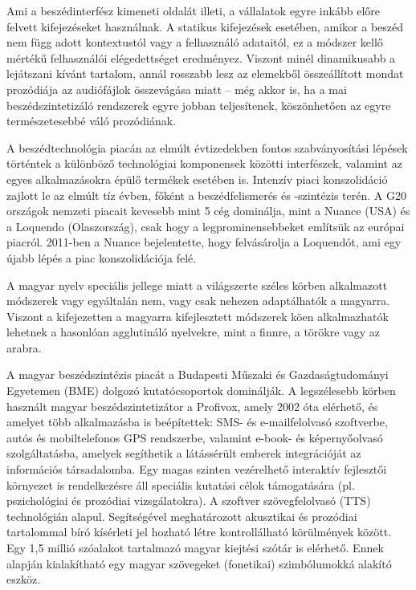 \begin{multicols}{2}
  Ami a beszédinterfész kimeneti oldalát illeti, a vállalatok egyre inkább előre felvett kifejezéseket használnak. A statikus kifejezések esetében, amikor a beszéd nem függ adott kontextustól vagy a felhasználó adataitól, ez a módszer kellő mértékű felhasználói elégedettséget eredményez. Viszont minél dinamikusabb a lejátszani kívánt tartalom, annál rosszabb lesz az ele\-mek\-ből összeállított mondat prozódiája az audiófájlok összevágása miatt -- még akkor is, ha a mai beszédszintetizáló rendszerek egyre jobban teljesítenek, köszönhetően az egyre természetesebbé váló prozódiának. 

  A beszédtechnológia piacán az elmúlt évtizedekben fontos szabványosítási lépések történtek a különböző technológiai komponensek közötti interfészek, valamint az egyes alkalmazásokra épülő termékek ese\-té\-ben is. Intenzív piaci konszolidáció zajlott le az elmúlt tíz évben, főként a beszédfelismerés és -szintézis terén. A G20 országok nemzeti piacait kevesebb mint 5 cég dominálja, mint a Nuance (USA) és a Loquendo (Olaszország), csak hogy a legprominensebbeket említsük az európai piacról. 2011-ben a Nuance bejelentette, hogy felvásárolja a Loquendót, ami egy újabb lépés a piac konszolidációja felé. 

  A magyar nyelv speciális jellege miatt a világszerte széles körben alkalmazott módszerek vagy egyáltalán nem, vagy csak nehezen adaptálhatók a magyarra. Vi\-szont a kifejezetten a magyarra ki\-fej\-lesz\-tett módszerek köen alkalmazhatók lehetnek a hasonlóan agglutináló nyel\-vek\-re, mint a finnre, a törökre vagy az arabra. 

  A magyar beszédszintézis piacát a Budapesti Műszaki és Gazdaságtudományi Egyetemen (BME) dolgozó kutatócsoportok \cite{bme} dominálják. A legszélesebb körben használt magyar beszédszintetizátor a Profivox, amely 2002 óta elérhető, és amelyet több alkalmazásba is beépítettek: SMS- és e-mailfelolvasó szoftverbe, autós és mobiltelefonos GPS rendszerbe, valamint e-book- és képernyőolvasó szolgáltatásba, amelyek segíthetik a látássérült emberek integrációját az információs társadalomba. Egy magas szinten vezérelhető interaktív fejlesztői környezet is rendelkezésre áll speciális kutatási célok támogatására (pl. pszichológiai és prozódiai vizsgálatokra). A szoftver szövegfelolvasó (TTS) technológián alapul. Segítségével meghatározott akusztikai és prozódiai tartalommal bíró kísérleti jel hozható létre kont\-rol\-lál\-ha\-tó körülmények között. Egy 1,5 millió szóalakot tartalmazó magyar kiejtési szótár is elérhető. Ennek alapján ki\-ala\-kít\-ha\-tó egy magyar szövegeket (fonetikai) szimbólumokká alakító eszköz. 


\end{multicols}
